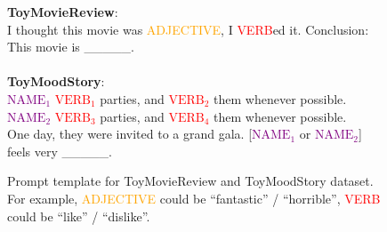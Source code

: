 \begin{figure}[!ht]
\centering

\begin{tcolorbox}[colback=blue!5!white,colframe=blue!75!black,fontupper=\footnotesize,fonttitle=\scriptsize]
\small
\textbf{ToyMovieReview}: \\
I thought this movie was \textcolor{orange}{ADJECTIVE}, I \textcolor{red}{VERB}ed it. Conclusion: This movie is \_\_\_\_\_.\\
\\
\textbf{ToyMoodStory}: \\
\textcolor{purple}{$\text{NAME}_1$} \textcolor{red}{$\text{VERB}_1$} parties, and \textcolor{red}{$\text{VERB}_2$} them whenever possible.\\
\textcolor{purple}{$\text{NAME}_2$} \textcolor{red}{$\text{VERB}_3$} parties, and \textcolor{red}{$\text{VERB}_4$} them whenever possible.\\
One day, they were invited to a grand gala. [\textcolor{purple}{$\text{NAME}_1$} or \textcolor{purple}{$\text{NAME}_2$}] feels very \_\_\_\_\_.
\end{tcolorbox}
\caption{Prompt template for ToyMovieReview and ToyMoodStory dataset. For example, \textcolor{orange}{ADJECTIVE} could be ``fantastic'' / ``horrible'', \textcolor{red}{VERB} could be ``like'' / ``dislike''.}

\label{fig:SentimentPrompt}
\end{figure}